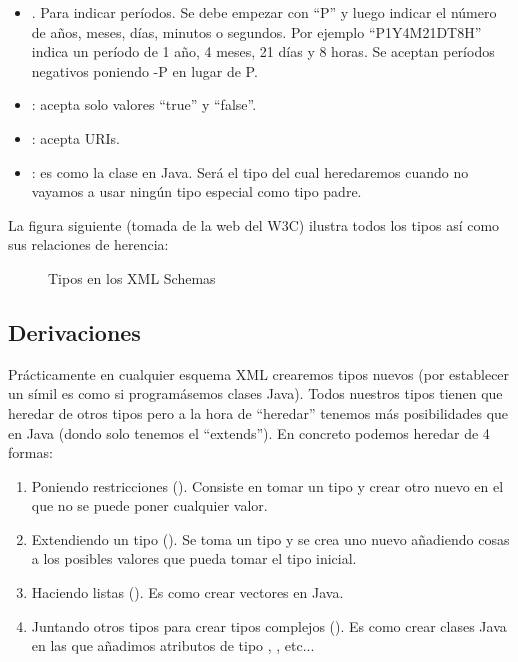 \documentclass[letterpaper,10pt,spanish]{sphinxmanual}
\begin{document}
\begin{itemize}
\item {} 
. Para indicar períodos. Se debe empezar con ``P'' y luego indicar el número de años, meses, días, minutos o segundos. Por ejemplo ``P1Y4M21DT8H'' indica un período de 1 año, 4 meses, 21 días y 8 horas. Se aceptan períodos negativos poniendo -P en lugar de P.

\item {} 
: acepta solo valores ``true'' y ``false''.

\item {} 
: acepta URIs.

\item {} 
: es como la clase  en Java. Será el tipo del cual heredaremos cuando no vayamos a usar ningún tipo especial como tipo padre.

\end{itemize}

La figura siguiente (tomada de la web del W3C) ilustra todos los tipos así como sus relaciones de herencia:
\begin{figure}[htbp]
\centering
\capstart

\noindent{}
\caption{Tipos en los XML Schemas}\label{tema5:id5}\end{figure}


\subsection{Derivaciones}
\label{tema5:derivaciones}
Prácticamente en cualquier esquema XML crearemos tipos nuevos (por establecer un símil es como si programásemos clases Java). Todos nuestros tipos tienen que heredar de otros tipos pero a la hora de ``heredar'' tenemos más posibilidades que en Java (dondo solo tenemos el ``extends''). En concreto podemos heredar de 4 formas:
\begin{enumerate}
\item {} 
Poniendo restricciones (). Consiste en tomar un tipo y crear otro nuevo en el que no se puede poner cualquier valor.

\item {} 
Extendiendo un tipo (). Se toma un tipo y se crea uno nuevo añadiendo cosas a los posibles valores que pueda tomar el tipo inicial.

\item {} 
Haciendo listas (). Es como crear vectores en Java.

\item {} 
Juntando otros tipos para crear tipos complejos (). Es como crear clases Java en las que añadimos atributos de tipo , , etc...

\end{enumerate}
\end{document}
